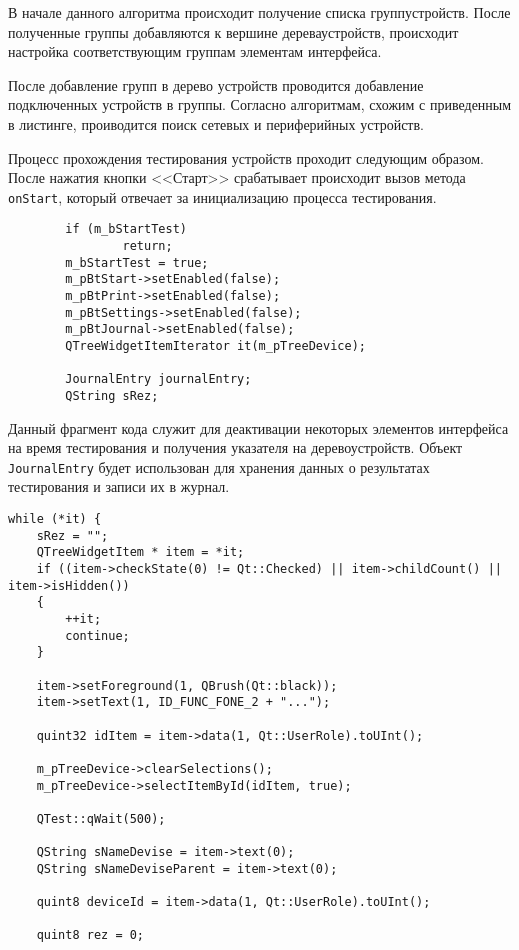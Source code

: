 В начале данного алгоритма происходит получение списка групп\break устройств. После полученные группы добавляются к вершине
дерева\break устройств, происходит настройка соответствующим группам элементам интерфейса.

После добавление групп в дерево устройств проводится добавление подключенных устройств в группы.
Согласно алгоритмам, схожим с приведенным в листинге, проиводится поиск сетевых и
периферийных устройств.

Процесс прохождения тестирования устройств проходит следующим образом. После нажатия кнопки <<Старт>> срабатывает
происходит вызов метода \texttt{onStart}, который отвечает за инициализацию процесса тестирования.
\medskip
\begin{verbatim}
        if (m_bStartTest)
                return;
        m_bStartTest = true;
        m_pBtStart->setEnabled(false);
        m_pBtPrint->setEnabled(false);
        m_pBtSettings->setEnabled(false);
        m_pBtJournal->setEnabled(false);
        QTreeWidgetItemIterator it(m_pTreeDevice);

        JournalEntry journalEntry;
        QString sRez;
\end{verbatim}
\medskip

Данный фрагмент кода служит для деактивации некоторых элементов интерфейса на время тестирования и получения указателя
на дерево\break устройств. Объект \texttt{JournalEntry} будет использован для хранения данных о результатах тестирования и
записи их в журнал.
\medskip
\begin{verbatim}
while (*it) {
	sRez = "";
	QTreeWidgetItem * item = *it;
	if ((item->checkState(0) != Qt::Checked) || item->childCount() || item->isHidden())
	{
		++it;
		continue;
	}

	item->setForeground(1, QBrush(Qt::black));
	item->setText(1, ID_FUNC_FONE_2 + "...");

	quint32 idItem = item->data(1, Qt::UserRole).toUInt();

	m_pTreeDevice->clearSelections();
	m_pTreeDevice->selectItemById(idItem, true);

	QTest::qWait(500);

	QString sNameDevise = item->text(0);
	QString sNameDeviseParent = item->text(0);

	quint8 deviceId = item->data(1, Qt::UserRole).toUInt();

	quint8 rez = 0;
\end{verbatim}
\medskip

